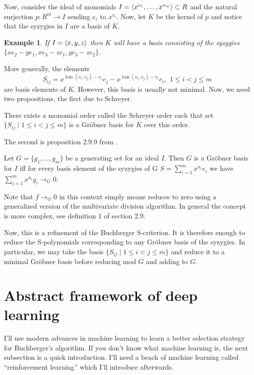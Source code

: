 \documentclass{article}
\theoremstyle{changedot}
\theoremstyle{changedotbreak}
\theoremstyle{nonumberplain}
\newtheorem{example}{Example}
\DeclarePairedDelimiter{\tuple}{\langle}{\rangle}
\DeclareMathOperator{\lcm}{lcm}
\begin{document}
Now, consider the ideal of monomials $I = \tuple{x^{v_{1}}, \dots, x^{v_{m}}} \subset R$ and the natural surjection $p : R^{m} \to I$ sending $e_{i}$ to $x^{v_{i}}$. Now, let $K$ be the kernel of $p$ and notice that the syzygies in $I$ are a basis of $K$.

\begin{example}
If $I = \tuple{x, y, z}$ then $K$ will have a basis consisting of the syzygies $\{x e_{2} - y e_{1}, x e_{3} - z e_{1}, y e_{3} - z e_{2}\}$. 
\end{example}

More generally, the elements \[S_{ij} = x^{\lcm(v_{i}, v_{j}) - v_{j}} e_{j} - x^{\lcm(v_{i}, v_{j}) - v_{i}} e_{i}, \, \, 1 \leq i < j \leq m\] are basis elements of $K$. However, this basis is usually not minimal. Now, we need two propositions, the first due to Schreyer.

\begin{theorem}
 There exists a monomial order called the Schreyer order such that set $\{S_{ij} \mid 1 \leq i < j \leq m\}$ is a Gröbner basis for $K$ over this order.
\end{theorem}

The second is proposition 2.9.9 from \cite{IVA}.

\begin{theorem}
  Let $G = \{g_{1}, \dots, g_{m}\}$ be a generating set for an ideal $I$. Then $G$ is a Gröbner basis for $I$ iff for every basis element of the syzygies of G $S = \sum_{i = 1}^{m} x^{u_{i}} e_{i}$ we have $\sum_{i=1}^{m} x^{u_{i}} g_{i} \to_{G} 0$.
\end{theorem}

Note that $f \to_{G} 0$ in this context simply means reduces to zero using a generalized version of the multivariate division algorithm. In general the concept is more complex, see \cite{IVA} definition 1 of section 2.9.

Now, this is a refinement of the Buchberger S-criterion. It is therefore enough to reduce the S-polynomials corresponding to any Gröbner basis of the syzygies. In particular, we may take the basis $\{S_{ij} \mid 1 \leq i < j \leq m\}$ and reduce it to a minimal Gröbner basis before reducing mod $G$ and adding to $G$.


\section{Abstract framework of deep learning}

I'll use modern advances in machine learning to learn a better selection strategy for Buchberger's algorithm. If you don't know what machine learning is, the next subsection is a quick introduction. I'll need a beach of machine learning called ``reinforcement learning'' which I'll introduce afterwards. 
\end{document}
